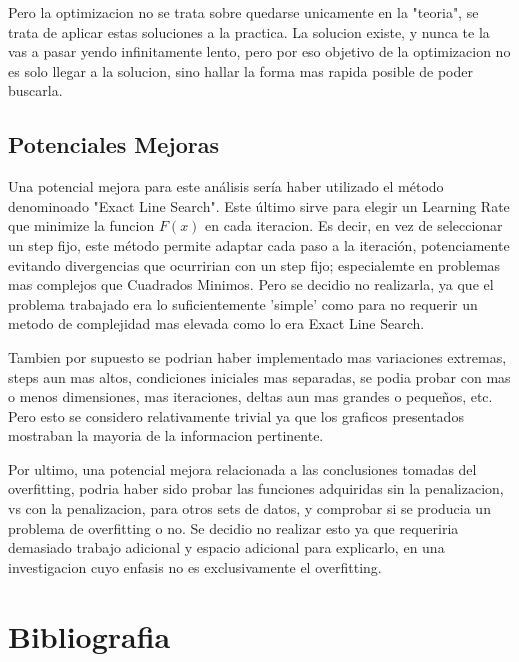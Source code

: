 \documentclass{article}
\begin{document}
\noindent Pero la optimizacion no se trata sobre quedarse unicamente en la "teoria", se trata de aplicar estas soluciones a la practica. La solucion existe, y nunca te la vas a pasar yendo infinitamente lento, pero por eso objetivo de la optimizacion no es solo llegar a la solucion, sino hallar la forma mas rapida posible de poder buscarla.  
\vspace{\baselineskip}

\subsection*{Potenciales Mejoras}

\noindent Una potencial mejora para este análisis sería haber utilizado el método denominoado "Exact Line Search". Este último sirve para elegir un Learning Rate que minimize la funcion $F(x)$ en cada iteracion. Es decir, en vez de seleccionar un step fijo, este método permite adaptar cada paso a la iteración, potenciamente evitando divergencias que ocurririan con un step fijo; especialemte en problemas mas complejos que Cuadrados Minimos. Pero se decidio no realizarla, ya que el problema trabajado era lo suficientemente 'simple' como para no requerir un metodo de complejidad mas elevada como lo era Exact Line Search.
\vspace{\baselineskip}

\noindent Tambien por supuesto se podrian haber implementado mas variaciones extremas, steps aun mas altos, condiciones iniciales mas separadas, se podia probar con mas o menos dimensiones, mas iteraciones, deltas aun mas grandes o pequeños, etc. Pero esto se considero relativamente trivial ya que los graficos presentados mostraban la mayoria de la informacion pertinente.
\vspace{\baselineskip}

\noindent Por ultimo, una potencial mejora relacionada a las conclusiones tomadas del overfitting, podria haber sido probar las funciones adquiridas sin la penalizacion, vs con la penalizacion, para otros sets de datos, y comprobar si se producia un problema de overfitting o no. Se decidio no realizar esto ya que requeriria demasiado trabajo adicional y espacio adicional para explicarlo, en una investigacion cuyo enfasis no es exclusivamente el overfitting. 
\vspace{10\baselineskip}

\label{LastPage}

\section*{Bibliografia}
\end{document}
